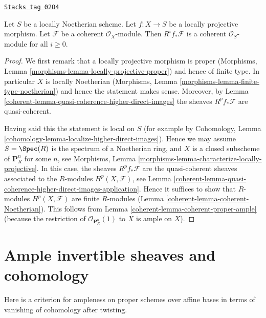\begin{lemma}
\label{coherent-lemma-locally-projective-pushforward}
\href{https://stacks.math.columbia.edu/tag/02O4}{\texttt{Stacks tag 02O4}}

Let $S$ be a locally Noetherian scheme.
Let $f : X \to S$ be a locally projective morphism.
Let $\mathcal{F}$ be a coherent $\mathcal{O}_X$-module.
Then $R^if_*\mathcal{F}$ is a coherent $\mathcal{O}_S$-module
for all $i \geq 0$.
\end{lemma}

\begin{proof}

We first remark that a locally projective morphism is proper
(Morphisms, Lemma \ref{morphisms-lemma-locally-projective-proper})
and hence of finite type.
In particular $X$ is locally Noetherian
(Morphisms, Lemma \ref{morphisms-lemma-finite-type-noetherian})
and hence the statement makes sense.
Moreover, by Lemma \ref{coherent-lemma-quasi-coherence-higher-direct-images}
the sheaves $R^pf_*\mathcal{F}$ are quasi-coherent.

\medskip\noindent
Having said this the statement is local on $S$ (for example by
Cohomology, Lemma \ref{cohomology-lemma-localize-higher-direct-images}).
Hence we may assume $S = \Spec(R)$ is the spectrum of
a Noetherian ring, and $X$ is a closed subscheme of
$\mathbf{P}^n_R$ for some $n$, see
Morphisms, Lemma \ref{morphisms-lemma-characterize-locally-projective}.
In this case, the sheaves $R^pf_*\mathcal{F}$ are the quasi-coherent
sheaves associated to the $R$-modules $H^p(X, \mathcal{F})$, see
Lemma \ref{coherent-lemma-quasi-coherence-higher-direct-images-application}.
Hence it suffices to show that $R$-modules $H^p(X, \mathcal{F})$
are finite $R$-modules (Lemma \ref{coherent-lemma-coherent-Noetherian}).
This follows from Lemma \ref{coherent-lemma-coherent-proper-ample}
(because the restriction of $\mathcal{O}_{\mathbf{P}^n_R}(1)$
to $X$ is ample on $X$).
\end{proof}

\section{Ample invertible sheaves and cohomology}
\label{coherent-section-ample-cohomology}
Here is a criterion for ampleness on proper schemes over affine bases
in terms of vanishing of cohomology after twisting.

